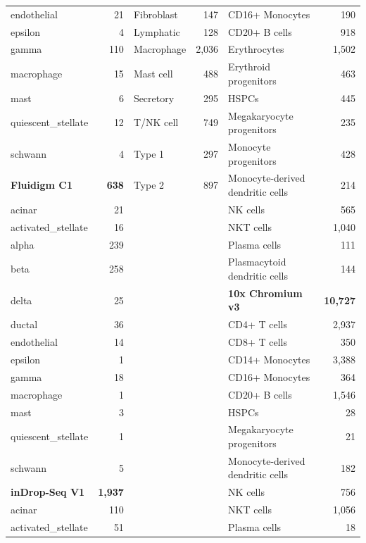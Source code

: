 \documentclass[11pt, a4paper]{article}
\begin{document}
\begin{xltabular}{\textwidth}{>{\raggedright\arraybackslash}X r >{\raggedright\arraybackslash}X r >{\raggedright\arraybackslash}X r}
\quad endothelial & 21 & \quad Fibroblast & 147 & \quad CD16+ Monocytes & 190 \\
\quad epsilon & 4 & \quad Lymphatic & 128 & \quad CD20+ B cells & 918 \\
\quad gamma & 110 & \quad Macrophage & 2,036 & \quad Erythrocytes & 1,502 \\
\quad macrophage & 15 & \quad Mast cell & 488 & \quad Erythroid progenitors & 463 \\
\quad mast & 6 & \quad Secretory & 295 & \quad HSPCs & 445 \\
\quad quiescent\_stellate & 12 & \quad T/NK cell & 749 & \quad Megakaryocyte progenitors & 235 \\
\quad schwann & 4 & \quad Type 1 & 297 & \quad Monocyte progenitors & 428 \\
\textbf{Fluidigm C1} & \textbf{638} & \quad Type 2 & 897 & \quad Monocyte-derived dendritic cells & 214 \\
\quad acinar & 21 &  &  & \quad NK cells & 565 \\
\quad activated\_stellate & 16 &  &  & \quad NKT cells & 1,040 \\
\quad alpha & 239 &  &  & \quad Plasma cells & 111 \\
\quad beta & 258 &  &  & \quad Plasmacytoid dendritic cells & 144 \\
\quad delta & 25 &  &  & \textbf{10x Chromium v3} & \textbf{10,727} \\
\quad ductal & 36 &  &  & \quad CD4+ T cells & 2,937 \\
\quad endothelial & 14 &  &  & \quad CD8+ T cells & 350 \\
\quad epsilon & 1 &  &  & \quad CD14+ Monocytes & 3,388 \\
\quad gamma & 18 &  &  & \quad CD16+ Monocytes & 364 \\
\quad macrophage & 1 &  &  & \quad CD20+ B cells & 1,546 \\
\quad mast & 3 &  &  & \quad HSPCs & 28 \\
\quad quiescent\_stellate & 1 &  &  & \quad Megakaryocyte progenitors & 21 \\
\quad schwann & 5 &  &  & \quad Monocyte-derived dendritic cells & 182 \\
\textbf{inDrop-Seq V1} & \textbf{1,937} &  &  & \quad NK cells & 756 \\
\quad acinar & 110 &  &  & \quad NKT cells & 1,056 \\
\quad activated\_stellate & 51 &  &  & \quad Plasma cells & 18 \\

\end{xltabular}
\end{document}

